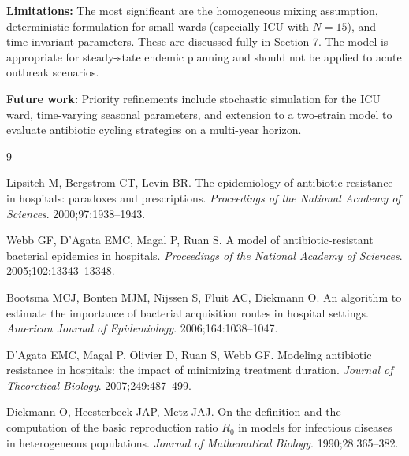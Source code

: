 \documentclass[12pt,a4paper]{article}
\begin{document}
\textbf{Limitations:} The most significant are the homogeneous mixing assumption, deterministic formulation for small wards (especially ICU with $N = 15$), and time-invariant parameters. These are discussed fully in Section 7. The model is appropriate for steady-state endemic planning and should not be applied to acute outbreak scenarios.

\textbf{Future work:} Priority refinements include stochastic simulation for the ICU ward, time-varying seasonal parameters, and extension to a two-strain model to evaluate antibiotic cycling strategies on a multi-year horizon.

\begin{thebibliography}{9}

Lipsitch M, Bergstrom CT, Levin BR.
The epidemiology of antibiotic resistance in hospitals: paradoxes and prescriptions.
\textit{Proceedings of the National Academy of Sciences}.
2000;97:1938--1943.

Webb GF, D'Agata EMC, Magal P, Ruan S.
A model of antibiotic-resistant bacterial epidemics in hospitals.
\textit{Proceedings of the National Academy of Sciences}.
2005;102:13343--13348.

Bootsma MCJ, Bonten MJM, Nijssen S, Fluit AC, Diekmann O.
An algorithm to estimate the importance of bacterial acquisition routes in hospital settings.
\textit{American Journal of Epidemiology}.
2006;164:1038--1047.

D'Agata EMC, Magal P, Olivier D, Ruan S, Webb GF.
Modeling antibiotic resistance in hospitals: the impact of minimizing treatment duration.
\textit{Journal of Theoretical Biology}.
2007;249:487--499.

Diekmann O, Heesterbeek JAP, Metz JAJ.
On the definition and the computation of the basic reproduction ratio $R_0$ in models for infectious diseases in heterogeneous populations.
\textit{Journal of Mathematical Biology}.
1990;28:365--382.

\end{thebibliography}
\end{document}
